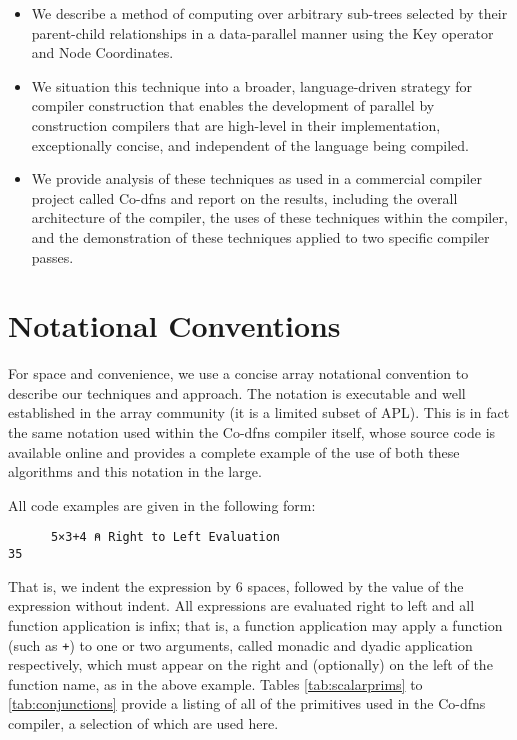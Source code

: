 \documentclass[numbers,preprint]{sigplanconf}
\begin{document}
\begin{itemize}[noitemsep]

\item We describe a method of computing over arbitrary sub-trees
selected by their parent-child relationships in a data-parallel manner
using the Key operator and Node Coordinates.

\item We situation this technique into a broader, language-driven 
strategy for compiler construction that enables the development of parallel 
by construction compilers that are high-level in their implementation, 
exceptionally concise, and independent of the language being compiled.

\item We provide analysis of these techniques as used in a commercial
compiler project called Co-dfns and report on the results,
including the overall architecture of the compiler, the uses of these 
techniques within the compiler, and the demonstration of these techniques 
applied to two specific compiler passes.

\end{itemize}

\section{Notational Conventions}

For space and convenience, we use a concise array notational convention to 
describe our techniques and approach. The notation is executable and well 
established in the array community (it is a limited subset of APL). This is 
in fact the same notation used within the Co-dfns compiler itself, whose 
source code is available online and provides a complete example of the use 
of both these algorithms and this notation in the large. 

All code examples are given in the following form:

\begin{verbatim}
      5×3+4 ⍝ Right to Left Evaluation
35
\end{verbatim}

That is, we indent the expression by 6 spaces, followed by the value
of the expression without indent. All expressions are evaluated right to 
left and all function application is infix; that is, a function 
application may apply a function (such as \verb;+;) to one or two arguments, 
called monadic and dyadic application respectively,
which must appear on the right and (optionally) on the left of the function 
name, as in the above example. Tables \ref{tab:scalarprims} to 
\ref{tab:conjunctions}
provide a listing of all of the primitives used in the Co-dfns compiler, 
a selection of which are used here. 
\end{document}
